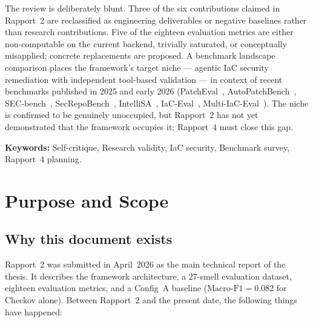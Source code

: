 \documentclass[11pt, a4paper]{report}
\begin{document}
The review is deliberately blunt. Three of the six contributions claimed in
Rapport~2 are reclassified as engineering deliverables or negative baselines
rather than research contributions. Five of the eighteen evaluation metrics
are either non-computable on the current backend, trivially saturated, or
conceptually misapplied; concrete replacements are proposed. A benchmark
landscape comparison places the framework's target niche --- agentic IaC
security remediation with independent tool-based validation --- in context of
recent benchmarks published in 2025 and early 2026 (PatchEval~\citep{lyu2024patcheval},
AutoPatchBench~\citep{autopatchbench2025}, SEC-bench~\citep{secbench2025},
SecRepoBench~\citep{secrepobench2025}, IntelliSA~\citep{intellisa2026},
IaC-Eval~\citep{kon2024iaceval}, Multi-IaC-Eval~\citep{multi2025iaceval}).
The niche is confirmed to be genuinely unoccupied, but Rapport~2 has not yet
demonstrated that the framework occupies it; Rapport~4 must close this gap.

\bigskip
\noindent\textbf{Keywords:} Self-critique, Research validity, IaC security,
Benchmark survey, Rapport~4 planning.

\tableofcontents

\chapter{Purpose and Scope}

\section{Why this document exists}

Rapport~2 was submitted in April~2026 as the main technical report of the
thesis. It describes the framework architecture, a 27-smell evaluation
dataset, eighteen evaluation metrics, and a Config~A baseline
($\text{Macro-F1} = 0.082$ for Checkov alone). Between Rapport~2 and the
present date, the following things have happened:
\end{document}
